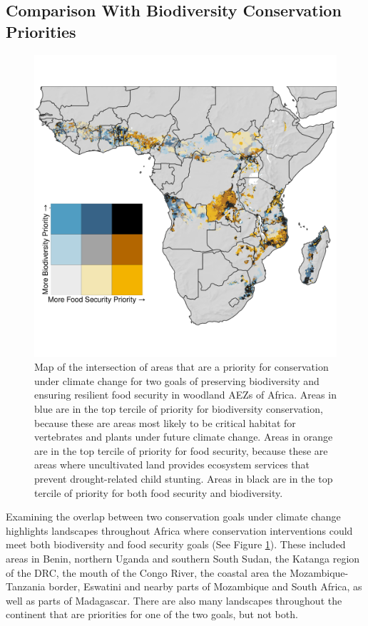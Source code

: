 \documentclass{article}
\begin{document}
\subsection{Comparison With Biodiversity Conservation Priorities}

\begin{figure}[h!]
	\begin{center}
		\includegraphics[width=0.8\linewidth]{Bivariate_Map.png}
		\caption{Map of the intersection of areas that are a priority for conservation under climate change for two goals of preserving biodiversity and ensuring resilient food security in woodland AEZs of Africa.  Areas in blue are in the top tercile of priority for biodiversity conservation, because these are areas most likely to be critical habitat for vertebrates and plants under future climate change.  Areas in orange are in the top tercile of priority for food security, because these are areas where uncultivated land provides ecosystem services that prevent drought-related child stunting.  Areas in black are in the top tercile of priority for both food security and biodiversity.}
		\label{fig:Bivariate_Map}
	\end{center}
\end{figure}

Examining the overlap between two conservation goals under climate change highlights landscapes throughout Africa where conservation interventions could meet both biodiversity and food security goals (See Figure \ref{fig:Bivariate_Map}).  These included areas in Benin, northern Uganda and southern South Sudan, the Katanga region of the DRC, the mouth of the Congo River, the coastal area the Mozambique-Tanzania border, Eswatini and nearby parts of Mozambique and South Africa, as well as parts of Madagascar. There are also many landscapes throughout the continent that are priorities for one of the two goals, but not both.
\end{document}
